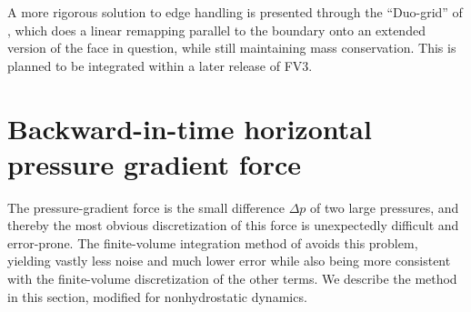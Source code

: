 \documentclass[10pt,letterpaper,margin=1in]{memoir}
\begin{document}
A more rigorous solution to edge handling is presented through the ``Duo-grid'' of \citet{XChen2021}, which does a linear remapping parallel to the boundary onto an extended version of the face in question, while still maintaining mass conservation. This is planned to be integrated within a later release of FV3.

%  
%
%




\section{Backward-in-time horizontal pressure gradient force} \label{sec:PGF}

The pressure-gradient force is the small difference $\Delta p$ of two large pressures, and thereby the most obvious discretization of this force is unexpectedly difficult and error-prone. The finite-volume integration method of \citet{L97} avoids this problem, yielding vastly less noise and much lower error while also being more consistent with the finite-volume discretization of the other terms. We describe the \citet{L97} method in this section, modified for nonhydrostatic dynamics.
\end{document}
